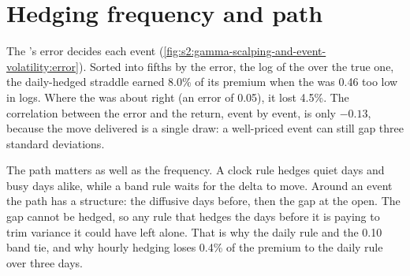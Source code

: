 \section{Hedging frequency and path}

The 's error decides each event (\cref{fig:s2:gamma-scalping-and-event-volatility:error}). Sorted into fifths by the error, the log of the
 over the true one, the daily-hedged straddle earned 8.0\% of its premium when the  was 0.46 too low in logs. Where the  was about right (an error of 0.05), it lost 4.5\%. The correlation between the error and the return, event by event, is only $-0.13$, because the
move delivered is a single draw: a well-priced event can still gap three standard deviations.

\begin{omfigure}

\label{fig:s2:gamma-scalping-and-event-volatility:error}
\end{omfigure}

The path matters as well as the frequency. A clock rule hedges quiet days and busy days alike, while a band rule waits for the delta to move. Around
an event the path has a structure: the diffusive days before, then the gap at the open. The gap cannot be hedged, so any rule that hedges the days
before it is paying to trim variance it could have left alone. That is why the daily rule and the 0.10 band tie, and why hourly hedging loses 0.4\%
of the premium to the daily rule over three days.

